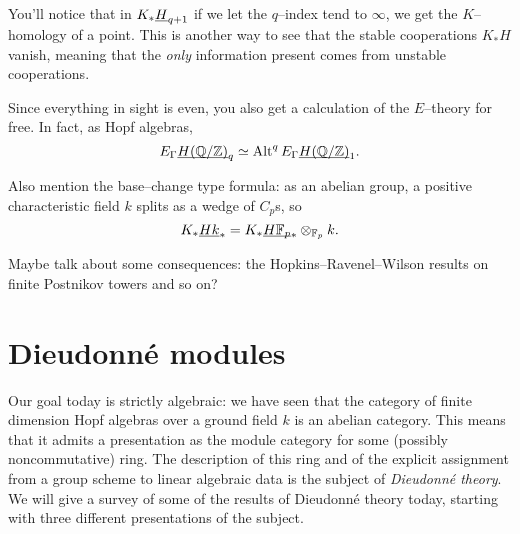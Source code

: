 








\begin{remark}
You'll notice that in $K_* \underline{\smash{H}}_{q+1}$ if we let the $q$--index tend to $\infty$, we get the $K$--homology of a point.  This is another way to see that the stable cooperations $K_* H$ vanish, meaning that the \emph{only} information present comes from unstable cooperations.
\end{remark}

\begin{remark}
Since everything in sight is even, you also get a calculation of the $E$--theory for free.  In fact, as Hopf algebras, \[E_\Gamma \underline{\smash{H(\mathbb{Q}/\mathbb Z)}}_{q} \simeq \operatorname{Alt}^q E_\Gamma \underline{\smash{H(\mathbb{Q}/\mathbb Z)}}_{1}.\]
\end{remark}

\begin{remark}
Also mention the base--change type formula: as an abelian group, a positive characteristic field $k$ splits as a wedge of $C_p$s, so \[K_* \underline{\smash{Hk}}_{*} = K_* \underline{\smash{H\mathbb F_p}}_{*} \otimes_{\mathbb F_p} k.\]
\end{remark}





Maybe talk about some consequences: the Hopkins--Ravenel--Wilson results on finite Postnikov towers and so on?








\section{Dieudonn\'e modules}

Our goal today is strictly algebraic: we have seen that the category of finite dimension Hopf algebras over a ground field $k$ is an abelian category.  This means that it admits a presentation as the module category for some (possibly noncommutative) ring.  The description of this ring and of the explicit assignment from a group scheme to linear algebraic data is the subject of \emph{Dieudonn\'e theory}.  We will give a survey of some of the results of Dieudonn\'e theory today, starting with three different presentations of the subject.

